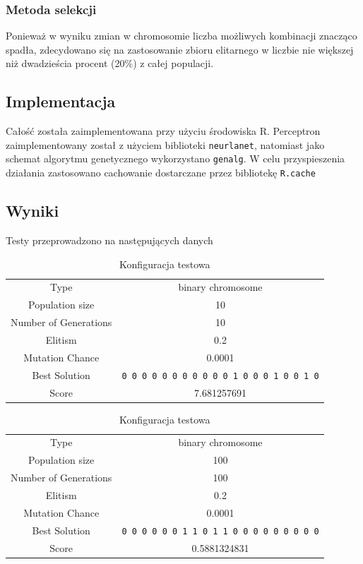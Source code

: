\documentclass{llncs}
\begin{document}
\subsubsection{Metoda selekcji}
Ponieważ w wyniku zmian w chromosomie liczba możliwych kombinacji znacząco spadła, zdecydowano się na 
zastosowanie zbioru elitarnego w liczbie nie większej niż dwadzieścia procent (20\%) z całej populacji.

\subsection{Implementacja}
Całość została zaimplementowana przy użyciu środowiska R. Perceptron zaimplementowany został
z użyciem biblioteki \texttt{neurlanet}\cite{R:neuralnet}, natomiast jako schemat algorytmu genetycznego wykorzystano
\texttt{genalg}\cite{R:genalg}. W celu przyspieszenia działania zastosowano cachowanie dostarczane przez bibliotekę
\texttt{R.cache}\cite{R:cache}

\subsection{Wyniki}
Testy przeprowadzono na następujących danych

\begin{table}[H]
\caption{Konfiguracja testowa}
\label{small}
\centering
\begin{tabular}{|c|c|}
  Type                  & binary chromosome \\
  Population size       & 10 \\
  Number of Generations & 10 \\
  Elitism               & 0.2 \\
  Mutation Chance       & 0.0001 \\
  Best Solution & \texttt{0 0 0 0 0 0 0 0 0 0 0 1 0 0 0 1 0 0 1 0} \\
  Score & 7.681257691 \\
\end{tabular} 

\end{table}

\begin{table}[H]
\caption{Konfiguracja testowa}
\label{mid}
\centering
\begin{tabular}{|c|c|}
  Type                  & binary chromosome \\
  Population size       & 100 \\
  Number of Generations & 100 \\
  Elitism               & 0.2 \\
  Mutation Chance       & 0.0001 \\
  Best Solution & \texttt{0 0 0 0 0 0 1 1 0 1 1 0 0 0 0 0 0 0 0 0} \\
  Score & 0.5881324831 \\
\end{tabular} 

\end{table}
\end{document}

